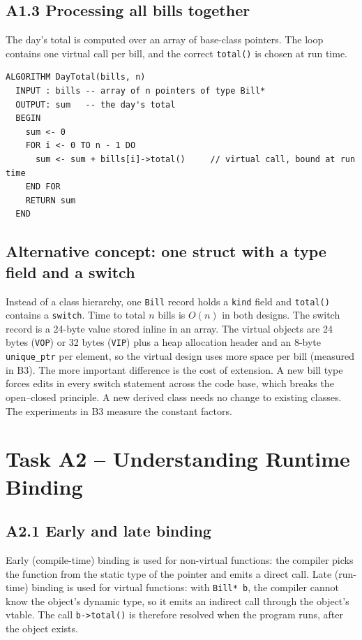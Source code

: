 \documentclass[11pt,a4paper]{article}
\begin{document}
\subsection*{A1.3 Processing all bills together}
The day's total is computed over an array of base-class pointers. The loop contains one virtual call per bill, and the correct \texttt{total()} is chosen at run time.

\begin{lstlisting}[style=pseudo,caption={Pseudocode: day total over base-class pointers}]
ALGORITHM DayTotal(bills, n)
  INPUT : bills -- array of n pointers of type Bill*
  OUTPUT: sum   -- the day's total
  BEGIN
    sum <- 0
    FOR i <- 0 TO n - 1 DO
      sum <- sum + bills[i]->total()     // virtual call, bound at run time
    END FOR
    RETURN sum
  END
\end{lstlisting}

\subsection*{Alternative concept: one struct with a type field and a switch}
Instead of a class hierarchy, one \texttt{Bill} record holds a \texttt{kind} field and \texttt{total()} contains a \texttt{switch}. Time to total $n$ bills is $O(n)$ in both designs. The switch record is a 24-byte value stored inline in an array. The virtual objects are 24 bytes (\texttt{VOP}) or 32 bytes (\texttt{VIP}) plus a heap allocation header and an 8-byte \texttt{unique\_ptr} per element, so the virtual design uses more space per bill (measured in B3). The more important difference is the cost of extension. A new bill type forces edits in every switch statement across the code base, which breaks the open--closed principle. A new derived class needs no change to existing classes. The experiments in B3 measure the constant factors.

\section{Task A2 -- Understanding Runtime Binding}
\subsection*{A2.1 Early and late binding}
Early (compile-time) binding is used for non-virtual functions: the compiler picks the function from the static type of the pointer and emits a direct call. Late (run-time) binding is used for virtual functions: with \texttt{Bill* b}, the compiler cannot know the object's dynamic type, so it emits an indirect call through the object's vtable. The call \texttt{b->total()} is therefore resolved when the program runs, after the object exists.
\end{document}
